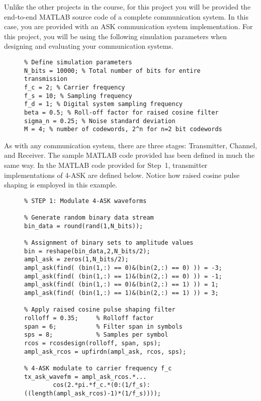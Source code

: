 \documentclass[letterpaper,12pt]{article}
\begin{document}
Unlike the other projects in the course, for this project you will be provided the end-to-end MATLAB source code of a complete communication system.  In this case, you are provided with
an ASK communication system implementation.  For this project, you will be using the following simulation parameters when designing and evaluating your communication systems.
\begin{figure}[h]
\centering
\begin{minipage}[framed]{0.9\textwidth}
\begin{lstlisting}
% Define simulation parameters
N_bits = 10000; % Total number of bits for entire transmission
f_c = 2; % Carrier frequency
f_s = 10; % Sampling frequency
f_d = 1; % Digital system sampling frequency
beta = 0.5; % Roll-off factor for raised cosine filter
sigma_n = 0.25; % Noise standard deviation
M = 4; % number of codewords, 2^n for n=2 bit codewords
\end{lstlisting}
\end{minipage}
\captionsetup{labelformat=empty}
\end{figure}

As with any communication system, there are three stages: Transmitter, Channel, and Receiver.  The sample MATLAB code provided has been defined in much the same way.  In the MATLAB code provided for Step~1, transmitter implementations of 4-ASK are defined below.  Notice how raised cosine pulse shaping is employed in this example.

\begin{figure}[h]
\centering
\begin{minipage}[framed]{0.9\textwidth}
\begin{lstlisting}
% STEP 1: Modulate 4-ASK waveforms

% Generate random binary data stream
bin_data = round(rand(1,N_bits));

% Assignment of binary sets to amplitude values
bin = reshape(bin_data,2,N_bits/2);
ampl_ask = zeros(1,N_bits/2);
ampl_ask(find( (bin(1,:) == 0)&(bin(2,:) == 0) )) = -3;
ampl_ask(find( (bin(1,:) == 1)&(bin(2,:) == 0) )) = -1;
ampl_ask(find( (bin(1,:) == 0)&(bin(2,:) == 1) )) = 1;
ampl_ask(find( (bin(1,:) == 1)&(bin(2,:) == 1) )) = 3;

% Apply raised cosine pulse shaping filter
rolloff = 0.35;     % Rolloff factor
span = 6;           % Filter span in symbols
sps = 8;            % Samples per symbol
rcos = rcosdesign(rolloff, span, sps);
ampl_ask_rcos = upfirdn(ampl_ask, rcos, sps);

% 4-ASK modulate to carrier frequency f_c
tx_ask_wavefm = ampl_ask_rcos.*...
        cos(2.*pi.*f_c.*(0:(1/f_s):((length(ampl_ask_rcos)-1)*(1/f_s))));
\end{lstlisting}
\end{minipage}
\captionsetup{labelformat=empty}
\end{figure}
\end{document}
